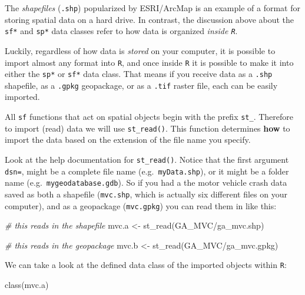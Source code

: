 \documentclass[
]{book}
\newenvironment{Shaded}{\begin{snugshade}}{\end{snugshade}}
\newcommand{\CommentTok}[1]{\textcolor[rgb]{0.56,0.35,0.01}{\textit{#1}}}
\newcommand{\FunctionTok}[1]{\textcolor[rgb]{0.00,0.00,0.00}{#1}}
\newcommand{\NormalTok}[1]{#1}
\newcommand{\OtherTok}[1]{\textcolor[rgb]{0.56,0.35,0.01}{#1}}
\newcommand{\StringTok}[1]{\textcolor[rgb]{0.31,0.60,0.02}{#1}}
\begin{document}
The \emph{shapefiles} (\texttt{.shp}) popularized by ESRI/ArcMap is an example of a format for storing spatial data on a hard drive. In contrast, the discussion above about the \texttt{sf*} and \texttt{sp*} data classes refer to how data is organized \emph{inside \texttt{R}}.

Luckily, regardless of how data is \emph{stored} on your computer, it is possible to import almost any format into \texttt{R}, and once inside \texttt{R} it is possible to make it into either the \texttt{sp*} or \texttt{sf*} data class. That means if you receive data as a \texttt{.shp} shapefile, as a \texttt{.gpkg} geopackage, or as a \texttt{.tif} raster file, each can be easily imported.

All \texttt{sf} functions that act on spatial objects begin with the prefix \texttt{st\_}. Therefore to import (read) data we will use \texttt{st\_read()}. This function determines \textbf{how} to import the data based on the extension of the file name you specify.

Look at the help documentation for \texttt{st\_read()}. Notice that the first argument \texttt{dsn=}, might be a complete file name (e.g.~\texttt{myData.shp}), or it might be a folder name (e.g.~\texttt{mygeodatabase.gdb}). So if you had a the motor vehicle crash data saved as both a shapefile (\texttt{mvc.shp}, which is actually six different files on your computer), and as a geopackage (\texttt{mvc.gpkg}) you can read them in like this:

\begin{Shaded}
\begin{Highlighting}[]
\CommentTok{\# this reads in the shapefile}
\NormalTok{mvc.a }\OtherTok{\textless{}{-}} \FunctionTok{st\_read}\NormalTok{(}\StringTok{\textquotesingle{}GA\_MVC/ga\_mvc.shp\textquotesingle{}}\NormalTok{)}

\CommentTok{\# this reads in the geopackage}
\NormalTok{mvc.b }\OtherTok{\textless{}{-}} \FunctionTok{st\_read}\NormalTok{(}\StringTok{\textquotesingle{}GA\_MVC/ga\_mvc.gpkg\textquotesingle{}}\NormalTok{)}
\end{Highlighting}
\end{Shaded}

We can take a look at the defined data class of the imported objects within \texttt{R}:

\begin{Shaded}
\begin{Highlighting}[]
\FunctionTok{class}\NormalTok{(mvc.a)}
\end{Highlighting}
\end{Shaded}
\end{document}
